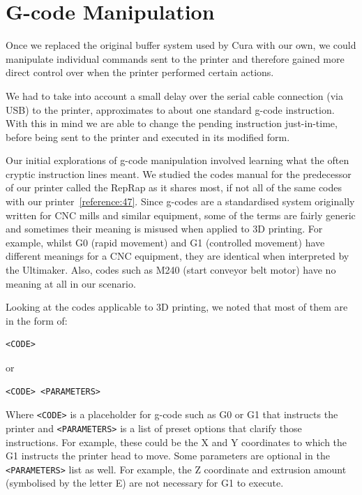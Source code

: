 \documentclass[11pt]{report} %
\begin{document}
\section{G-code Manipulation}
Once we replaced the original buffer system used by Cura with our own, we could manipulate individual commands sent to the printer and therefore gained more direct control over when the printer performed certain actions.

We had to take into account a small delay over the serial cable connection (via USB) to the printer, approximates to about one standard g-code instruction. With this in mind we are able to change the pending instruction just-in-time, before being sent to the printer and executed in its modified form.

Our initial explorations of g-code manipulation involved learning what the often cryptic instruction lines meant. We studied the codes manual for the predecessor of our printer called the RepRap as it shares most, if not all of the same codes with our printer~\ref{reference:47}. Since g-codes are a standardised system originally written for CNC mills and similar equipment, some of the terms are fairly generic and sometimes their meaning is misused when applied to 3D printing. For example, whilst G0 (rapid movement) and G1 (controlled movement) have different meanings for a CNC equipment, they are identical when interpreted by the Ultimaker. Also, codes such as M240 (start conveyor belt motor) have no meaning at all in our scenario.

Looking at the codes applicable to 3D printing, we noted that most of them are in the form of:
\begin{verbatim}
<CODE>
\end{verbatim}
or
\begin{verbatim}
<CODE> <PARAMETERS>
\end{verbatim}

Where \verb|<CODE>| is a placeholder for g-code such as G0 or G1 that instructs the printer and \verb|<PARAMETERS>| is a list of preset options that clarify those instructions. For example, these could be the X and Y coordinates to which the G1 instructs the printer head to move. Some parameters are optional in the \verb|<PARAMETERS>| list as well. For example, the Z coordinate and extrusion amount (symbolised by the letter E) are not necessary for G1 to execute.
\end{document}
